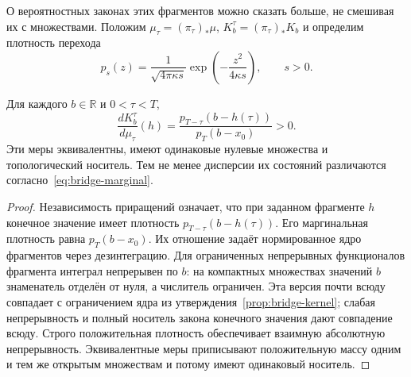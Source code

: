 {О вероятностных законах этих фрагментов можно сказать больше, не смешивая их с множествами. Положим $\mu_\tau=(\pi_\tau)_*\mu$, $K_b^\tau=(\pi_\tau)_*K_b$ и определим плотность перехода}
\[
p_s(z)=\frac{1}{\sqrt{4\pi\kappa s}}\exp\left(-\frac{z^2}{4\kappa s}\right),\qquad s>0.
\]
\begin{proposition}
\label{prop:prefix-equivalence}
{Для каждого $b\in\mathbb R$ и $0<\tau<T$,}
\begin{equation}\label{eq:prefix-density}
\frac{dK_b^\tau}{d\mu_\tau}(h)=
\frac{p_{T-\tau}(b-h(\tau))}{p_T(b-x_0)}>0.
\end{equation}
{Эти меры эквивалентны, имеют одинаковые нулевые множества и топологический носитель. Тем не менее дисперсии их состояний различаются согласно~\eqref{eq:bridge-marginal}.}
\end{proposition}
\begin{proof}
{Независимость приращений означает, что при заданном фрагменте $h$ конечное значение имеет плотность $p_{T-\tau}(b-h(\tau))$. Его маргинальная плотность равна $p_T(b-x_0)$. Их отношение задаёт нормированное ядро фрагментов через дезинтеграцию. Для ограниченных непрерывных функционалов фрагмента интеграл непрерывен по $b$: на компактных множествах значений $b$ знаменатель отделён от нуля, а числитель ограничен. Эта версия почти всюду совпадает с ограничением ядра из утверждения~\ref{prop:bridge-kernel}; слабая непрерывность и полный носитель закона конечного значения дают совпадение всюду. Строго положительная плотность обеспечивает взаимную абсолютную непрерывность. Эквивалентные меры приписывают положительную массу одним и тем же открытым множествам и потому имеют одинаковый носитель.}
\end{proof}


